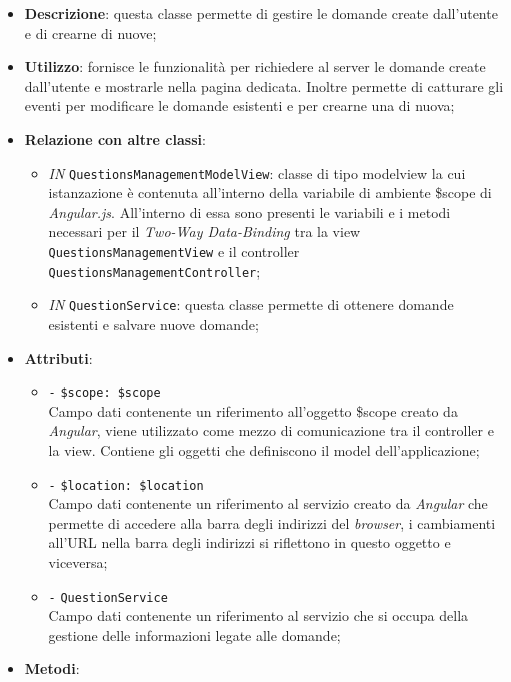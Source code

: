 \begin{itemize}
	\item \textbf{Descrizione}: questa classe permette di gestire le domande create dall'utente e di crearne di nuove;
	\item \textbf{Utilizzo}: fornisce le funzionalità per richiedere al server le domande create dall'utente e mostrarle nella pagina dedicata. Inoltre permette di catturare gli eventi per modificare le domande esistenti e per crearne una di nuova; 
	\item \textbf{Relazione con altre classi}:
	\begin{itemize}
		\item \textit{IN} \texttt{QuestionsManagementModelView}: classe di tipo modelview la cui istanzazione è contenuta all'interno della variabile di ambiente \$scope di \textit{Angular.js}. All'interno di essa sono presenti le variabili e i metodi necessari per il \textit{Two-Way Data-Binding} tra la view \texttt{QuestionsManagementView} e il controller \texttt{QuestionsManagementController}; 
		\item \textit{IN} \texttt{QuestionService}: questa classe permette di ottenere domande esistenti e salvare nuove domande;
	\end{itemize}
	\item \textbf{Attributi}:
	\begin{itemize}
		\item \texttt{-} \texttt{\$scope: \$scope} \\
		Campo dati contenente un riferimento all’oggetto \$scope creato da \textit{Angular}, viene utilizzato come mezzo di comunicazione tra il controller e la view. Contiene gli oggetti che definiscono il model dell’applicazione;
		\item \texttt{-} \texttt{\$location: \$location} \\
		Campo dati contenente un riferimento al servizio creato da \textit{Angular} che permette di accedere alla barra degli indirizzi del \textit{browser}, i cambiamenti all’URL nella barra degli indirizzi si riflettono in questo oggetto e viceversa;
		\item \texttt{-} \texttt{QuestionService}\\
		Campo dati contenente un riferimento al servizio che si occupa della gestione delle informazioni legate alle domande;
	\end{itemize}
	\item \textbf{Metodi}:
	\begin{itemize}

\end{itemize}
\end{itemize}
